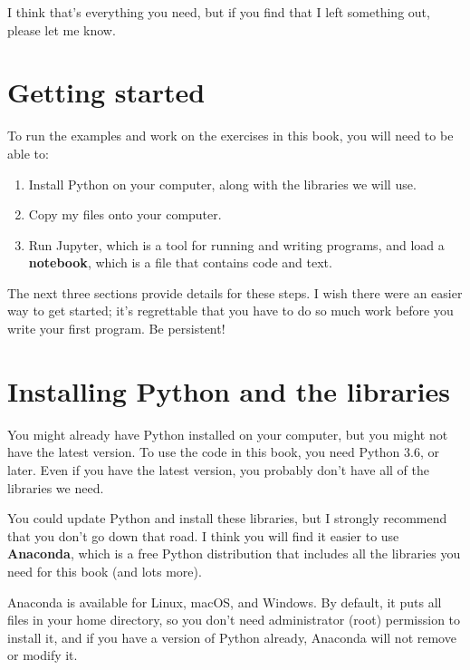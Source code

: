 \documentclass[12pt]{book}
\theoremstyle{exercise}
\begin{document}
I think that's everything you need, but if you find that I left something out, please let me know.


\section{Getting started}
\label{code}

To run the examples and work on the exercises in this book, you will need to be able to:

\begin{enumerate}

\item Install Python on your computer, along with the libraries we will use.

\item Copy my files onto your computer.

\item Run Jupyter, which is a tool for running and writing programs, and load a {\bf notebook}, which is a file that contains code and text.

\end{enumerate}

The next three sections provide details for these steps.  I wish there were an easier way to get started; it's regrettable that you have to do so much work before you write your first program.  Be persistent!


\section{Installing Python and the libraries}

You might already have Python installed on your computer, but you might not have the latest version.  To use the code in this book, you need Python 3.6, or later.  Even if you have the latest version, you probably don't have all of the libraries we need.

You could update Python and install these libraries, but I strongly recommend that you don't go down that road.  I think you will find it easier to use {\bf Anaconda}, which is a free Python distribution that includes all the libraries you need for this book (and lots more).

Anaconda is available for Linux, macOS, and Windows.  By default, it puts all files in your home directory, so you don't need administrator (root) permission to install it, and if you have a version of Python already, Anaconda will not remove or modify it.
\end{document}
